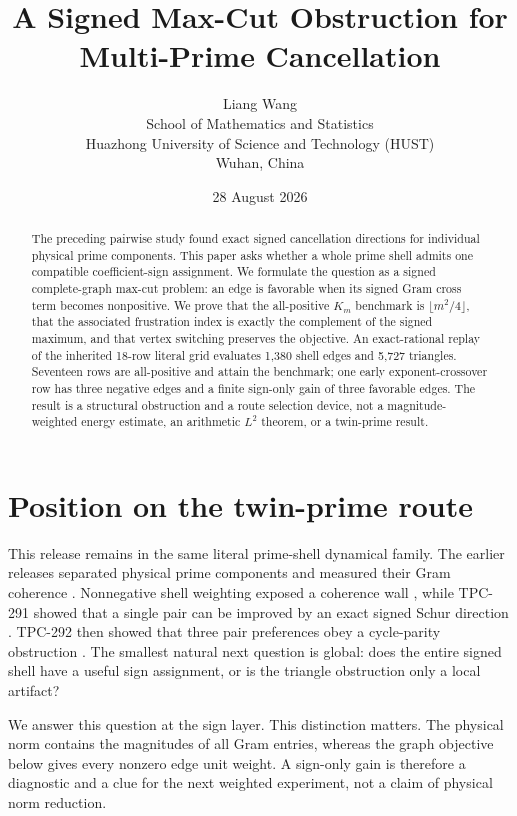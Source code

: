 \documentclass[10pt]{article}
\title{A Signed Max-Cut Obstruction for Multi-Prime Cancellation}
\author{Liang Wang\\
School of Mathematics and Statistics\\
Huazhong University of Science and Technology (HUST)\\
Wuhan, China}
\date{28 August 2026}
\begin{document}
\maketitle

\begin{abstract}
The preceding pairwise study found exact signed cancellation directions for
individual physical prime components.  This paper asks whether a whole prime
shell admits one compatible coefficient-sign assignment.  We formulate the
question as a signed complete-graph max-cut problem: an edge is favorable
when its signed Gram cross term becomes nonpositive.  We prove that the
all-positive $K_m$ benchmark is $\lfloor m^2/4\rfloor$, that the associated
frustration index is exactly the complement of the signed maximum, and that
vertex switching preserves the objective.  An exact-rational replay of the
inherited 18-row literal grid evaluates 1,380 shell edges and 5,727 triangles.
Seventeen rows are all-positive and attain the benchmark; one early
exponent-crossover row has three negative edges and a finite sign-only gain of
three favorable edges.  The result is a structural obstruction and a route
selection device, not a magnitude-weighted energy estimate, an arithmetic
$L^2$ theorem, or a twin-prime result.
\end{abstract}

\section{Position on the twin-prime route}

This release remains in the same literal prime-shell dynamical family.  The
earlier releases separated physical prime components and measured their Gram
coherence \cite{tpc287,tpc288,tpc289}.  Nonnegative shell weighting exposed a
coherence wall \cite{tpc290}, while TPC-291 showed that a single pair can be
improved by an exact signed Schur direction \cite{tpc291}.  TPC-292 then
showed that three pair preferences obey a cycle-parity obstruction
\cite{tpc292}.  The smallest natural next question is global: does the entire
signed shell have a useful sign assignment, or is the triangle obstruction
only a local artifact?

We answer this question at the sign layer.  This distinction matters.  The
physical norm contains the magnitudes of all Gram entries, whereas the graph
objective below gives every nonzero edge unit weight.  A sign-only gain is
therefore a diagnostic and a clue for the next weighted experiment, not a
claim of physical norm reduction.
\end{document}
